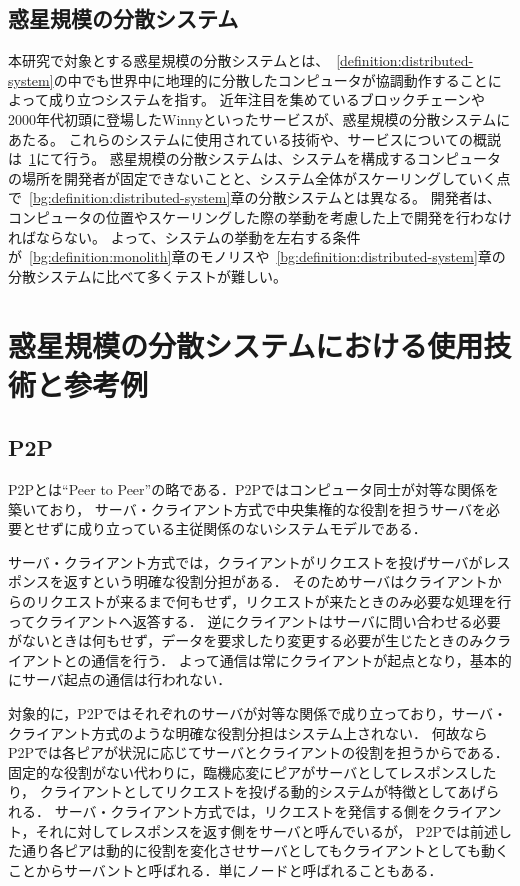\subsection{惑星規模の分散システム}
\label{bg:definition:planetary-scale-distributed-system}

本研究で対象とする惑星規模の分散システムとは、~\ref{definition:distributed-system}の中でも世界中に地理的に分散したコンピュータが協調動作することによって成り立つシステムを指す。
近年注目を集めているブロックチェーンや2000年代初頭に登場したWinnyといったサービスが、惑星規模の分散システムにあたる。
これらのシステムに使用されている技術や、サービスについての概説は~\ref{bg:planetary-scale-distributed-system}にて行う。
惑星規模の分散システムは、システムを構成するコンピュータの場所を開発者が固定できないことと、システム全体がスケーリングしていく点で~\ref{bg:definition:distributed-system}章の分散システムとは異なる。
開発者は、コンピュータの位置やスケーリングした際の挙動を考慮した上で開発を行わなければならない。
よって、システムの挙動を左右する条件が~\ref{bg:definition:monolith}章のモノリスや~\ref{bg:definition:distributed-system}章の分散システムに比べて多くテストが難しい。

\section{惑星規模の分散システムにおける使用技術と参考例}
\label{bg:planetary-scale-distributed-system}

\subsection{P2P}
\label{bg:planetary-scale-distributed-system:p2p}

P2Pとは``Peer to Peer''の略である．P2Pではコンピュータ同士が対等な関係を築いており，
サーバ・クライアント方式で中央集権的な役割を担うサーバを必要とせずに成り立っている主従関係のないシステムモデルである．

サーバ・クライアント方式では，クライアントがリクエストを投げサーバがレスポンスを返すという明確な役割分担がある．
そのためサーバはクライアントからのリクエストが来るまで何もせず，リクエストが来たときのみ必要な処理を行ってクライアントへ返答する．
逆にクライアントはサーバに問い合わせる必要がないときは何もせず，データを要求したり変更する必要が生じたときのみクライアントとの通信を行う．
よって通信は常にクライアントが起点となり，基本的にサーバ起点の通信は行われない．

対象的に，P2Pではそれぞれのサーバが対等な関係で成り立っており，サーバ・クライアント方式のような明確な役割分担はシステム上されない．
何故ならP2Pでは各ピアが状況に応じてサーバとクライアントの役割を担うからである．固定的な役割がない代わりに，臨機応変にピアがサーバとしてレスポンスしたり，
クライアントとしてリクエストを投げる動的システムが特徴としてあげられる．
サーバ・クライアント方式では，リクエストを発信する側をクライアント，それに対してレスポンスを返す側をサーバと呼んでいるが，
P2Pでは前述した通り各ピアは動的に役割を変化させサーバとしてもクライアントとしても動くことからサーバントと呼ばれる．単にノードと呼ばれることもある．

